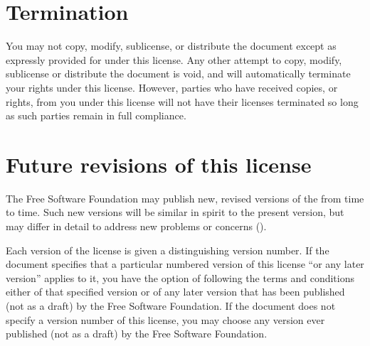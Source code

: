 \begin{multicols}{3}
\section{Termination}

You may not copy, modify, sublicense, or distribute the document except as expressly provided for under this license. Any other attempt to copy, modify, sublicense or distribute the document is void, and will automatically terminate your rights under this license. However, parties who have received copies, or rights, from you under this license will not have their licenses terminated so long as such parties remain in full compliance.

\section{Future revisions of this license}

The Free Software Foundation may publish new, revised versions of the
\fdl from time to time. Such new versions will be similar in spirit to
the present version, but may differ in detail to address new problems or
concerns ({\webCopyLeft}).

Each version of the license is given a distinguishing version number. If the document specifies that a particular numbered version of this license \enquote{or any later version} applies to it, you have the option of following the terms and conditions either of that specified version or of any later version that has been published (not as a draft) by the Free Software Foundation. If the document does not specify a version number of this license, you may choose any version ever published (not as a draft) by the Free Software Foundation.
\par \widebaselines \par
\end{multicols}
\egroup

